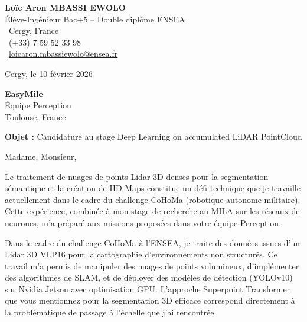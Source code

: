 \documentclass[a4paper,11pt]{article}
\begin{document}
\noindent
\begin{minipage}[t]{0.5\textwidth}
    \textbf{Loïc Aron MBASSI EWOLO}\\
    Élève-Ingénieur Bac+5 -- Double diplôme ENSEA\\[3pt]
    \faMapMarker\ Cergy, France\\
    \faPhone\ (+33) 7 59 52 33 98\\
    \faEnvelope\ \href{mailto:loicaron.mbassiewolo@ensea.fr}{loicaron.mbassiewolo@ensea.fr}
\end{minipage}
\hfill
\begin{minipage}[t]{0.4\textwidth}
    \raggedleft
    Cergy, le 10 février 2026
\end{minipage}

\vspace{1.2cm}

\hfill
\begin{minipage}[t]{0.5\textwidth}
    \raggedleft
    \textbf{EasyMile}\\
    Équipe Perception\\
    Toulouse, France
\end{minipage}

\vspace{1cm}

\noindent\textbf{Objet :} Candidature au stage Deep Learning on accumulated LiDAR PointCloud

\vspace{0.8cm}

Madame, Monsieur,

Le traitement de nuages de points Lidar 3D denses pour la segmentation sémantique et la création de HD Maps constitue un défi technique que je travaille actuellement dans le cadre du challenge CoHoMa (robotique autonome militaire). Cette expérience, combinée à mon stage de recherche au MILA sur les réseaux de neurones, m'a préparé aux missions proposées dans votre équipe Perception.

Dans le cadre du challenge CoHoMa à l'ENSEA, je traite des données issues d'un Lidar 3D VLP16 pour la cartographie d'environnements non structurés. Ce travail m'a permis de manipuler des nuages de points volumineux, d'implémenter des algorithmes de SLAM, et de déployer des modèles de détection (YOLOv10) sur Nvidia Jetson avec optimisation GPU. L'approche Superpoint Transformer que vous mentionnez pour la segmentation 3D efficace correspond directement à la problématique de passage à l'échelle que j'ai rencontrée.
\end{document}
